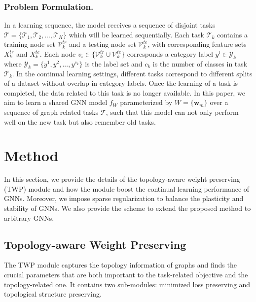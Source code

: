 \documentclass[letterpaper]{article} %
\begin{document}
\subsubsection{Problem Formulation.}
In a learning sequence, the model
receives a sequence of disjoint tasks
$\mathcal{T}=\{\mathcal{T}_1,\mathcal{T}_2,...,\mathcal{T}_K\}$ which will be learned sequentially.
Each task $\mathcal{T}_k$ contains a training node set $\mathcal{V}_k^{tr}$ and a testing node set $\mathcal{V}_k^{te}$, with corresponding feature sets $X_k^{tr}$ and $X_k^{te}$.
Each node $v_i \in \{\mathcal{V}_k^{tr} \cup \mathcal{V}_k^{te} \}$ corresponds a category label $y^l \in \mathcal{Y}_k$ where $\mathcal{Y}_k = \{y^1, y^2,...,y^{c_k} \}$ is the label set and $c_k$ is the number of classes in task $\mathcal{T}_k$.
In the continual learning settings, different tasks correspond to different splits of a dataset without overlap in category labels.
Once the learning of a task is completed, the data related to this task is no longer available.
In this paper, we aim to learn a shared GNN model $f_W$ parameterized by $W=\{\boldsymbol{w}_m\}$ over a sequence of graph related tasks $\mathcal{T}$,  %
such that this model can not only perform well on the new task but also remember old tasks.

\section{Method}
In this section,
we provide the details of
the topology-aware weight preserving (TWP) module
and how the module boost
the continual learning performance of
GNNs.
Moreover, we impose sparse regularization to
balance the plasticity and stability of GNNs.
We also provide the scheme to extend the proposed
method to arbitrary GNNs.

\subsection{Topology-aware Weight Preserving}

The TWP module captures the topology information of graphs
and finds the crucial parameters that are both important
to the task-related objective and the topology-related one.
It contains two sub-modules:
minimized loss preserving and topological structure preserving.
\end{document}
